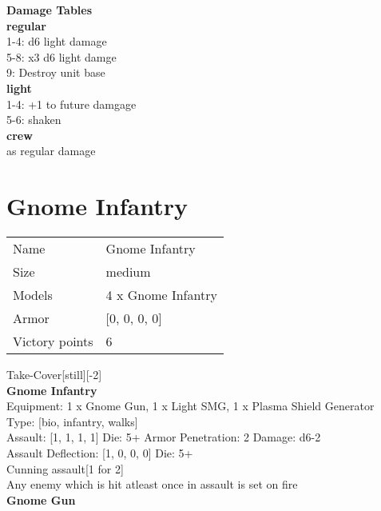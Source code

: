  





{\bf Damage Tables} \\
 {\bf regular } \\
1-4: d6 light damage \\
5-8: x3 d6 light damge \\
9: Destroy unit base \\
 {\bf light } \\
1-4: +1 to future damgage \\
5-6: shaken \\
 {\bf crew } \\
as regular damage \\










\pagebreak\pagebreak

\section{ Gnome Infantry }

\begin{tabular}{ll}
  Name & Gnome Infantry \\
  Size & medium\\
  Models & 4 x Gnome Infantry\\
  Armor & [0, 0, 0, 0]\\
  Victory points & 6\\
\end{tabular}

Take-Cover[still][-2]\\ 


{\bf Gnome Infantry } \\
Equipment: 1 x Gnome Gun, 1 x Light SMG, 1 x Plasma Shield Generator \\
Type: [bio, infantry, walks] \\

Assault: [1, 1, 1, 1] Die: 5+ Armor Penetration: 2 Damage: d6-2 \\
Assault Deflection: [1, 0, 0, 0] Die: 5+\\
\indent Cunning assault[1 for 2]\\ 
Any enemy which is hit atleast once in assault is set on fire\\ 

{\bf Gnome Gun } \\



